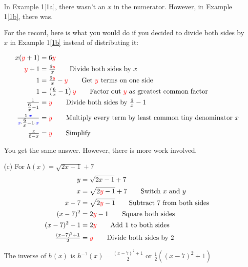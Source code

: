 \begin{solution}
In Example 1\ref{1a}, there wasn't an $x$ in the numerator. However, in Example 1\ref{1b}, there was. \newline 

For the record, here is what you would do if you decided to divide both sides by $x$ in Example 1\ref{1b} instead of distributing it:

\begin{align*}
    x({\color{red}{y}}+1) &= 6{\color{red}{y}} \\
    {\color{red}{y}} + 1 &= \tfrac{6{\color{red}{y}}}{x} \qquad \text{Divide both sides by $x$} \\
    1 &= \tfrac{6{\color{red}{y}}}{x}-{\color{red}{y}} \qquad \text{Get ${\color{red}{y}}$ terms on one side} \\
    1 &= \left(\tfrac{6}{x}-1\right){\color{red}{y}} \qquad \text{Factor out ${\color{red}{y}}$ as greatest common factor} \\
    \tfrac{1}{\tfrac{6}{x}-1} &= {\color{red}{y}} \qquad \text{Divide both sides by $\tfrac{6}{x}-1$} \\
    \tfrac{1 \cdot {\color{blue}{x}}}{{\color{blue}{x}} \cdot \tfrac{6}{x}-1 \cdot {\color{blue}{x}}} &= {\color{red}{y}} \qquad \text{Multiply every term by least common tiny denominator $x$} \\
    \tfrac{x}{6-x} &= {\color{red}{y}} \qquad \text{Simplify} 
\end{align*}

\vspace{11pt}

You get the same answer. However, there is more work involved. \newline 

\dotfill \newline 

(c) For $h(x) = \sqrt{2x-1}+7$
\begin{align*}
    y &= \sqrt{2x-1}+7 \\
    x &= \sqrt{2{\color{red}{y}}-1}+7 \qquad \text{Switch $x$ and $y$} \\
    x-7 &= \sqrt{2{\color{red}{y}}-1} \qquad \text{Subtract 7 from both sides} \\
    (x-7)^2 &= 2{\color{red}{y}} -1 \qquad \text{Square both sides} \\
    (x-7)^2 + 1 &= 2{\color{red}{y}} \qquad \text{Add 1 to both sides} \\
    \tfrac{(x-7)^2+1}{2} &= {\color{red}{y}} \qquad \text{Divide both sides by 2}
\end{align*}

The inverse of $h(x)$ is $\boxed{h^{-1}(x) = \tfrac{(x-7)^2+1}{2} \text{ or } \tfrac{1}{2}\left((x-7)^2+1\right)}$


\end{solution}
